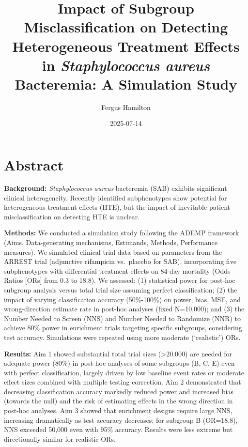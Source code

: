 \documentclass[
  letterpaper,
  DIV=11,
  numbers=noendperiod]{scrartcl}
\title{Impact of Subgroup Misclassification on Detecting Heterogeneous
Treatment Effects in \emph{Staphylococcus aureus} Bacteremia: A
Simulation Study}
\author{Fergus Hamilton}
\date{2025-07-14}
\renewcommand*\contentsname{Table of contents}
\newcommand\contentsname{Table of contents}
\begin{document}
\maketitle

\renewcommand*\contentsname{Table of contents}
{
\hypersetup{linkcolor=}
\setcounter{tocdepth}{3}
\tableofcontents
}

\section{Abstract}\label{abstract}

\textbf{Background:} \emph{Staphylococcus aureus} bacteremia (SAB)
exhibits significant clinical heterogeneity. Recently identified
subphenotypes show potential for heterogeneous treatment effects (HTE),
but the impact of inevitable patient misclassification on detecting HTE
is unclear.

\textbf{Methods:} We conducted a simulation study following the ADEMP
framework (Aims, Data-generating mechanisms, Estimands, Methods,
Performance measures). We simulated clinical trial data based on
parameters from the ARREST trial (adjunctive rifampicin vs.~placebo for
SAB), incorporating five subphenotypes with differential treatment
effects on 84-day mortality (Odds Ratios {[}ORs{]} from 0.3 to 18.8). We
assessed: (1) statistical power for post-hoc subgroup analysis versus
total trial size assuming perfect classification; (2) the impact of
varying classification accuracy (50\%-100\%) on power, bias, MSE, and
wrong-direction estimate rate in post-hoc analyses (fixed N=10,000); and
(3) the Number Needed to Screen (NNS) and Number Needed to Randomize
(NNR) to achieve 80\% power in enrichment trials targeting specific
subgroups, considering test accuracy. Simulations were repeated using
more moderate (`realistic') ORs.

\textbf{Results:} Aim 1 showed substantial total trial sizes
(\textgreater20,000) are needed for adequate power (80\%) in post-hoc
analyses of some subgroups (B, C, E) even with perfect classification,
largely driven by low baseline event rates or moderate effect sizes
combined with multiple testing correction. Aim 2 demonstrated that
decreasing classification accuracy markedly reduced power and increased
bias (towards the null) and the risk of estimating effects in the wrong
direction in post-hoc analyses. Aim 3 showed that enrichment designs
require large NNS, increasing dramatically as test accuracy decreases;
for subgroup B (OR=18.8), NNS exceeded 50,000 even with 95\% accuracy.
Results were less extreme but directionally similar for realistic ORs.
\end{document}
